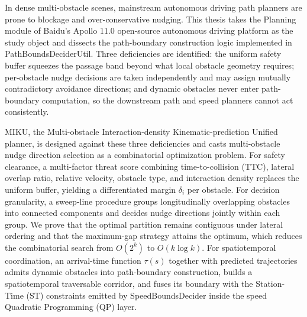 \clearpage
{}
{}
\thispagestyle{fancy}

\begin{center}
{\bfseries \thesisTitleEn}
\end{center}

\vspace{0.5em}

{

\noindent\hspace{2em}{\bfseries Abstract: }In dense multi-obstacle scenes, mainstream autonomous driving path planners are prone to blockage and over-conservative nudging. This thesis takes the Planning module of Baidu's Apollo 11.0 open-source autonomous driving platform as the study object and dissects the path-boundary construction logic implemented in PathBoundsDeciderUtil. Three deficiencies are identified: the uniform safety buffer squeezes the passage band beyond what local obstacle geometry requires; per-obstacle nudge decisions are taken independently and may assign mutually contradictory avoidance directions; and dynamic obstacles never enter path-boundary computation, so the downstream path and speed planners cannot act consistently.

MIKU, the Multi-obstacle Interaction-density Kinematic-prediction Unified planner, is designed against these three deficiencies and casts multi-obstacle nudge direction selection as a combinatorial optimization problem. For safety clearance, a multi-factor threat score combining time-to-collision (TTC), lateral overlap ratio, relative velocity, obstacle type, and interaction density replaces the uniform buffer, yielding a differentiated margin $\delta_i$ per obstacle. For decision granularity, a sweep-line procedure groups longitudinally overlapping obstacles into connected components and decides nudge directions jointly within each group. We prove that the optimal partition remains contiguous under lateral ordering and that the maximum-gap strategy attains the optimum, which reduces the combinatorial search from $O(2^k)$ to $O(k\log k)$. For spatiotemporal coordination, an arrival-time function $\tau(s)$ together with predicted trajectories admits dynamic obstacles into path-boundary construction, builds a spatiotemporal traversable corridor, and fuses its boundary with the Station-Time (ST) constraints emitted by SpeedBoundsDecider inside the speed Quadratic Programming (QP) layer.

}
